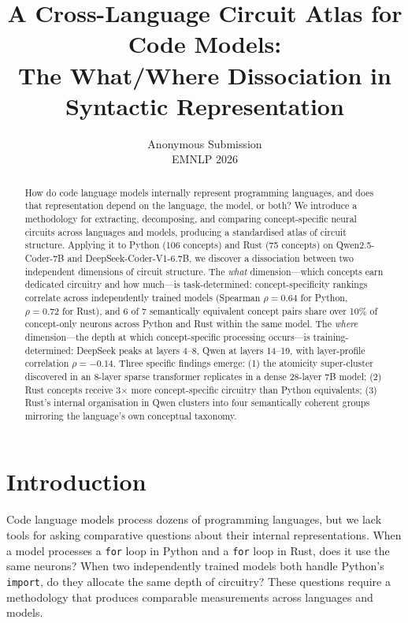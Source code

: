 \documentclass[11pt]{article}
\title{A Cross-Language Circuit Atlas for Code Models:\\
The What/Where Dissociation in Syntactic Representation}
\author{Anonymous Submission \\
        EMNLP 2026}
\date{}
\begin{document}
\maketitle

\begin{abstract}
How do code language models internally represent programming languages, and does that representation depend on the language, the model, or both? We introduce a methodology for extracting, decomposing, and comparing concept-specific neural circuits across languages and models, producing a standardised atlas of circuit structure. Applying it to Python (106 concepts) and Rust (75 concepts) on Qwen2.5-Coder-7B and DeepSeek-Coder-V1-6.7B, we discover a dissociation between two independent dimensions of circuit structure. The \textit{what} dimension---which concepts earn dedicated circuitry and how much---is task-determined: concept-specificity rankings correlate across independently trained models (Spearman $\rho = 0.64$ for Python, $\rho = 0.72$ for Rust), and 6 of 7 semantically equivalent concept pairs share over 10\% of concept-only neurons across Python and Rust within the same model. The \textit{where} dimension---the depth at which concept-specific processing occurs---is training-determined: DeepSeek peaks at layers 4--8, Qwen at layers 14--19, with layer-profile correlation $\rho = -0.14$. Three specific findings emerge: (1) the atomicity super-cluster discovered in an 8-layer sparse transformer replicates in a dense 28-layer 7B model; (2) Rust concepts receive 3$\times$ more concept-specific circuitry than Python equivalents; (3) Rust's internal organisation in Qwen clusters into four semantically coherent groups mirroring the language's own conceptual taxonomy.
\end{abstract}

\section{Introduction}

Code language models process dozens of programming languages, but we lack tools for asking comparative questions about their internal representations. When a model processes a \texttt{for} loop in Python and a \texttt{for} loop in Rust, does it use the same neurons? When two independently trained models both handle Python's \texttt{import}, do they allocate the same depth of circuitry? These questions require a methodology that produces comparable measurements across languages and models.
\end{document}
